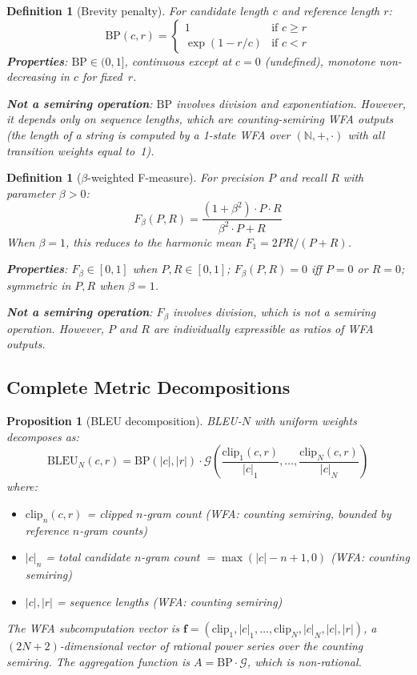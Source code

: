 \documentclass[11pt]{article}
\newtheorem{definition}[theorem]{Definition}
\newtheorem{proposition}[theorem]{Proposition}
\newcommand{\N}{\mathbb{N}}
\begin{document}
\begin{definition}[Brevity penalty]\label{def:bp}
For candidate length $c$ and reference length $r$:
\[
\mathrm{BP}(c, r) = \begin{cases}
  1 & \text{if } c \geq r \\
  \exp(1 - r/c) & \text{if } c < r
\end{cases}
\]
\textbf{Properties}: $\mathrm{BP} \in (0, 1]$, continuous except at
$c = 0$ (undefined), monotone non-decreasing in $c$ for fixed~$r$.

\textbf{Not a semiring operation}: $\mathrm{BP}$ involves division
and exponentiation.  However, it depends only on sequence \emph{lengths},
which are counting-semiring WFA outputs (the length of a string is
computed by a 1-state WFA over $(\N, +, \cdot)$ with all
transition weights equal to~1).
\end{definition}

\begin{definition}[$\beta$-weighted F-measure]\label{def:fmeasure}
For precision $P$ and recall $R$ with parameter $\beta > 0$:
\[
F_\beta(P, R) = \frac{(1 + \beta^2) \cdot P \cdot R}
                      {\beta^2 \cdot P + R}
\]
When $\beta = 1$, this reduces to the harmonic mean
$F_1 = 2PR/(P+R)$.

\textbf{Properties}: $F_\beta \in [0,1]$ when $P, R \in [0,1]$;
$F_\beta(P,R) = 0$ iff $P = 0$ or $R = 0$;
symmetric in $P,R$ when $\beta = 1$.

\textbf{Not a semiring operation}: $F_\beta$ involves division, which
is not a semiring operation.  However, $P$ and $R$ are individually
expressible as ratios of WFA outputs.
\end{definition}

\subsection{Complete Metric Decompositions}

\begin{proposition}[BLEU decomposition]\label{prop:bleu-decomp}
BLEU-$N$ with uniform weights decomposes as:
\[
\mathrm{BLEU}_N(c, r) = \mathrm{BP}(|c|, |r|) \cdot
  \mathcal{G}\!\left(\frac{\mathrm{clip}_1(c,r)}{|c|_1},\ldots,
  \frac{\mathrm{clip}_N(c,r)}{|c|_N}\right)
\]
where:
\begin{itemize}[nosep]
\item $\mathrm{clip}_n(c,r)$ = clipped $n$-gram count (WFA: counting semiring,
  bounded by reference $n$-gram counts)
\item $|c|_n$ = total candidate $n$-gram count $= \max(|c| - n + 1, 0)$
  (WFA: counting semiring)
\item $|c|, |r|$ = sequence lengths (WFA: counting semiring)
\end{itemize}
The WFA subcomputation vector is
$\mathbf{f} = (\mathrm{clip}_1, |c|_1, \ldots, \mathrm{clip}_N,
|c|_N, |c|, |r|)$, a $(2N+2)$-dimensional vector of rational
power series over the counting semiring.  The aggregation function is
$A = \mathrm{BP} \cdot \mathcal{G}$, which is non-rational.
\end{proposition}
\end{document}

